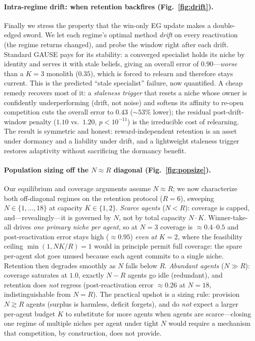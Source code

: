 \documentclass{article}
\begin{document}
\paragraph{Intra-regime drift: when retention backfires
(Fig.~\ref{fig:drift}).} Finally we stress the property that the win-only EG update
makes a double-edged sword. We let each regime's optimal method \emph{drift} on every
reactivation (the regime returns changed), and probe the window right after each drift.
Standard GAUSE pays for its stability: a converged specialist holds its niche by
identity and serves it with stale beliefs, giving an overall error of $0.90$---\emph{worse}
than a $K{=}3$ monolith ($0.35$), which is forced to relearn and therefore stays current.
This is the predicted ``stale specialist'' failure, now quantified. A cheap remedy
recovers most of it: a \emph{staleness trigger} that resets a niche whose owner is
confidently underperforming (drift, not noise) and softens its affinity to re-open
competition cuts the overall error to $0.43$ ($\sim53\%$ lower); the residual
post-drift-window penalty ($1.10$ vs.\ $1.20$, $p<10^{-11}$) is the irreducible cost of
relearning. The result is symmetric and honest: reward-independent retention is an
asset under dormancy and a liability under drift, and a lightweight staleness trigger
restores adaptivity without sacrificing the dormancy benefit.

\paragraph{Population sizing off the $N\approx R$ diagonal
(Fig.~\ref{fig:popsize}).} Our equilibrium and coverage arguments assume $N\approx R$;
we now characterize both off-diagonal regimes on the retention protocol ($R{=}6$),
sweeping $N\in\{1,\dots,18\}$ at capacity $K\in\{1,2\}$. \emph{Scarce agents}
($N<R$): coverage is capped, and---revealingly---it is governed by $N$, not by total
capacity $N\!\cdot\!K$. Winner-take-all drives \emph{one primary niche per agent}, so
at $N{=}3$ coverage is $\approx 0.4$--$0.5$ and post-reactivation error stays high
($\approx 0.95$) \emph{even at $K{=}2$}, where the feasibility ceiling
$\min(1,N\!K/R){=}1$ would in principle permit full coverage: the spare per-agent slot
goes unused because each agent commits to a single niche. Retention then degrades
smoothly as $N$ falls below $R$. \emph{Abundant agents} ($N\gg R$): coverage saturates
at $1.0$, exactly $N-R$ agents go idle (redundant), and retention does \emph{not}
regress (post-reactivation error $\approx 0.26$ at $N{=}18$, indistinguishable from
$N{=}R$). The practical upshot is a sizing rule: provision $N\gtrsim R$ agents
(surplus is harmless, deficit forgets), and do \emph{not} expect a larger per-agent
budget $K$ to substitute for more agents when agents are scarce---closing one regime of
multiple niches per agent under tight $N$ would require a mechanism that competition,
by construction, does not provide.
\end{document}

